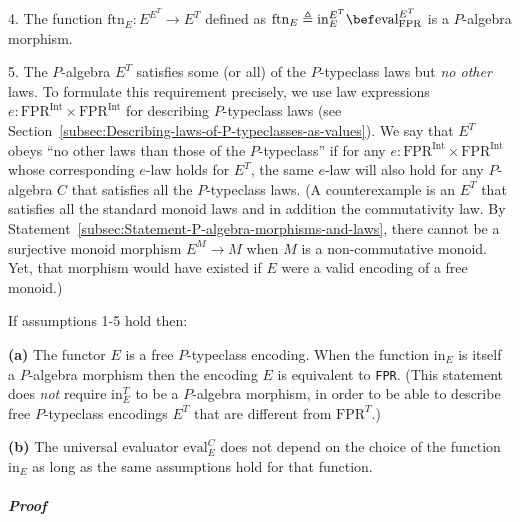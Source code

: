 4. The function $\text{ftn}_{E}:E^{E^{T}}\rightarrow E^{T}$ defined
as $\text{ftn}_{E}\triangleq\text{in}_{E}^{E^{T}}\bef\text{eval}_{\text{FPR}}^{E^{T}}$
is a $P$-algebra morphism.

5. The $P$-algebra $E^{T}$ satisfies some (or all) of the $P$-typeclass
laws but \emph{no other} laws. To formulate this requirement precisely,
we use law expressions $e:\text{FPR}^{\text{Int}}\times\text{FPR}^{\text{Int}}$
for describing $P$-typeclass laws (see Section~\ref{subsec:Describing-laws-of-P-typeclasses-as-values}).
We say that $E^{T}$ obeys \textsf{``}no other laws than those of the $P$-typeclass\textsf{''}
if for any $e:\text{FPR}^{\text{Int}}\times\text{FPR}^{\text{Int}}$
whose corresponding $e$-law holds for $E^{T}$, the same $e$-law
will also hold for any $P$-algebra $C$ that satisfies all the $P$-typeclass
laws. (A counterexample is an $E^{T}$ that satisfies all the standard
monoid laws and in addition the commutativity law. By Statement~\ref{subsec:Statement-P-algebra-morphisms-and-laws},
there cannot be a surjective monoid morphism $E^{M}\rightarrow M$
when $M$ is a non-commutative monoid. Yet, that morphism would have
existed if $E$ were a valid encoding of a free monoid.)

If assumptions 1-5 hold then:

\textbf{(a)} The functor $E$ is a free $P$-typeclass encoding. When
the function $\text{in}_{E}$ is itself a $P$-algebra morphism then
the encoding $E$ is equivalent to \lstinline!FPR!.
(This statement does \emph{not} require $\text{in}_{E}^{T}$ to be
a $P$-algebra morphism, in order to be able to describe free $P$-typeclass
encodings $E^{T}$ that are different from $\text{FPR}^{T}$.)

\textbf{(b)} The universal evaluator $\text{eval}_{E}^{C}$ does not
depend on the choice of the function $\text{in}_{E}$ as long as the
same assumptions hold for that function.

\subparagraph{Proof}

